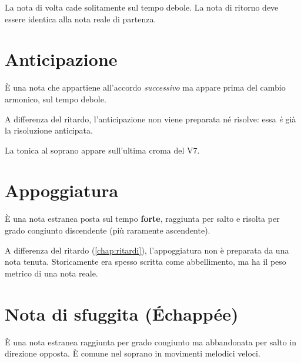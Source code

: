 \begin{regola}
    La nota di volta cade solitamente sul tempo debole. La nota di ritorno deve essere identica alla nota reale di partenza.
\end{regola}

\section{Anticipazione}
\label{sec:anticipazione}

\begin{definizione}[Anticipazione]
    È una nota che appartiene all'accordo \textit{successivo} ma appare prima del cambio armonico, sul tempo debole.
\end{definizione}

\begin{regola}
    A differenza del ritardo, l'anticipazione non viene preparata né risolve: essa \textit{è} già la risoluzione anticipata.
\end{regola}

\begin{esempio}
    La tonica al soprano appare sull'ultima croma del V7.
\end{esempio}

\section{Appoggiatura}
\label{sec:appoggiatura}

\begin{definizione}[Appoggiatura]
    È una nota estranea posta sul tempo \textbf{forte}, raggiunta per salto e risolta per grado congiunto discendente (più raramente ascendente).
\end{definizione}

\begin{regola}
    A differenza del ritardo (\ref{chap:ritardi}), l'appoggiatura non è preparata da una nota tenuta. Storicamente era spesso scritta come abbellimento, ma ha il peso metrico di una nota reale.
\end{regola}

\section{Nota di sfuggita (Échappée)}
\label{sec:sfuggita}

\begin{definizione}
    È una nota estranea raggiunta per grado congiunto ma abbandonata per salto in direzione opposta. È comune nel soprano in movimenti melodici veloci.
\end{definizione}

